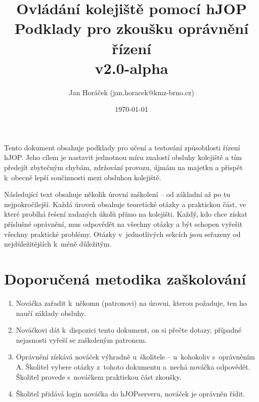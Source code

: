 \documentclass[12pt,a4paper]{article}
\begin{document}
\thispagestyle{empty}

\setlength{\parindent}{0cm}
\setlength{\parskip}{1mm plus2pt minus1pt}

\setlength{\droptitle}{-5em}

\title{
\Large Ovládání kolejiště pomocí hJOP\\
\LARGE Podklady pro zkoušku oprávnění řízení\\
\small v2.0-alpha}
\author{Jan Horáček (jan.horacek@kmz-brno.cz)}
\date{\today}
\maketitle

Tento dokument obsahuje podklady pro učení a testování způsobilosti řízení
hJOP. Jeho cílem je nastavit jednotnou míru znalostí obsluhy kolejiště a tím
předejít zbytečným chybám, zdržování provozu, újmám na majetku a přispět
k~obecně lepší součinnosti mezi obsluhou kolejiště.

Následující text obsahuje několik úrovní zaškolení – od základní až po tu
nejpokročilejší. Každá úroveň obsahuje teoretické otázky a praktickou část, ve
které probíhá řešení zadaných úkolů přímo na kolejišti. Každý, kdo chce získat
příslušné oprávnění, mus odpovědět na všechny otázky a být schopen vyřešit
všechny praktické problémy. Otázky v~jednotlivých sekcích jsou seřazeny od
nejdůležitějších k~méně důležitým.

\section{Doporučená metodika zaškolování}

\begin{enumerate}[leftmargin=*]
\item Nováčka zařadit k~někomu (patronovi) na úrovni, kterou požaduje, ten ho
naučí základy obsluhy.
\item Nováčkovi dát k~dispozici tento dokument, on si přečte dotazy, případné
nejasnosti vyřeší se zaškoleným patronem.
\item Oprávnění získává nováček výhradně u~školitele – u~kohokoliv s~oprávněním
A. Školitel vybere otázky z~tohoto dokumentu a~nechá nováčka odpovědět. Školitel
provede s~no\-váč\-kem praktickou část zkoušky.
\item Školitel přidává login nováčka do hJOPserveru, nováček je oprávněn řídit.
\end{enumerate}

\newpage
\end{document}
